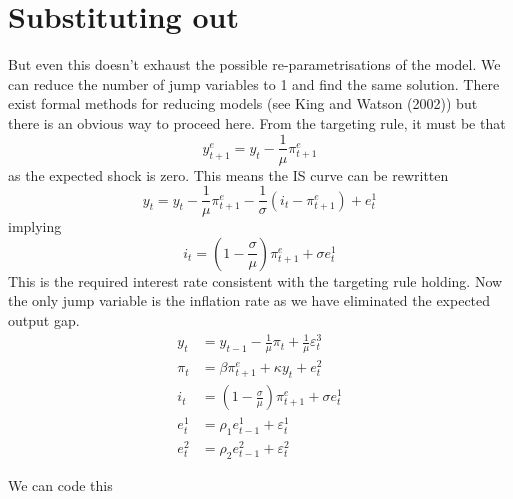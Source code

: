 \documentclass[
  letterpaper,
]{book}
\begin{document}
\hypertarget{substituting-out}{%
\section{Substituting out}\label{substituting-out}}

But even this doesn't exhaust the possible re-parametrisations of the
model. We can reduce the number of jump variables to 1 and find the same
solution. There exist formal methods for reducing models (see King and
Watson (2002)) but there is an obvious way to proceed here. From the
targeting rule, it must be that \[
  y^e_{t+1} = y_t - \frac{1}{\mu}\pi^e_{t+1}
\] as the expected shock is zero. This means the IS curve can be
rewritten \[
y_t = y_t - \frac{1}{\mu}\pi^e_{t+1} - \frac{1}{\sigma} \left (i_t - \pi_{t+1}^e \right ) + e_t^1
\] implying \[
i_t =  \left (1 - \frac{\sigma}{\mu} \right )\pi_{t+1}^e + \sigma e_t^1
\] This is the required interest rate consistent with the targeting rule
holding. Now the only jump variable is the inflation rate as we have
eliminated the expected output gap. \[
\begin{aligned}
y_t    &= y_{t-1} -\frac{1}{\mu} \pi_t  + \frac{1}{\mu} \varepsilon^3_t \\
\pi_t  &= \beta \pi_{t+1}^e + \kappa y_t + e_t^2 \\
i_t    &= \left (1 - \frac{\sigma}{\mu} \right ) \pi_{t+1}^e + \sigma e_t^1 \\
e_t^1  &= \rho_1 e_{t-1}^1 + \varepsilon_t^1 \\ 
e_t^2  &= \rho_2 e_{t-1}^2 + \varepsilon_t^2 
\end{aligned}
\]

We can code this
\end{document}
